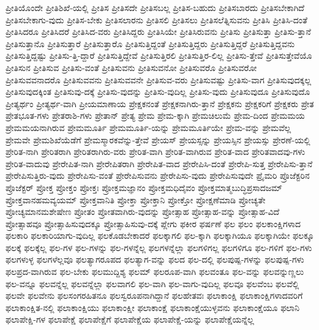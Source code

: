 {ಪ್ರೀತಿಯೊಂದೇ
ಪ್ರೀತಿಶಿಖೆ-ಯಲ್ಲಿ
ಪ್ರೀತಿಸ
ಪ್ರೀತಿಸದೇ
ಪ್ರೀತಿಸಬಲ್ಲ
ಪ್ರೀತಿಸ-ಬಹುದು
ಪ್ರೀತಿಸಬಾರದು
ಪ್ರೀತಿಸಬೇಕಾಗಿದೆ
ಪ್ರೀತಿಸಬೇಕಾಗು-ವುದು
ಪ್ರೀತಿಸ-ಬೇಕು
ಪ್ರೀತಿಸಲಾರನು
ಪ್ರೀತಿಸಲಿ
ಪ್ರೀತಿಸಲು
ಪ್ರೀತಿಸಲೆತ್ನಿಸುವನು
ಪ್ರೀತಿಸಿ
ಪ್ರೀತಿಸಿ-ದಂತೆ
ಪ್ರೀತಿಸಿದರೂ
ಪ್ರೀತಿಸಿದರೆ
ಪ್ರೀತಿಸಿದ-ವರು
ಪ್ರೀತಿಸಿದ್ದರು
ಪ್ರೀತಿಸಿಯೇ
ಪ್ರೀತಿಸಿರುವನು
ಪ್ರೀತಿಸು
ಪ್ರೀತಿಸುತ್ತಾ
ಪ್ರೀತಿಸು-ತ್ತಾನೆ
ಪ್ರೀತಿಸುತ್ತಾನೊ
ಪ್ರೀತಿಸುತ್ತಾರೆ
ಪ್ರೀತಿಸುತ್ತಾರೊ
ಪ್ರೀತಿಸುತ್ತಿದ್ದಂತೆ
ಪ್ರೀತಿಸುತ್ತಿದ್ದರು
ಪ್ರೀತಿಸುತ್ತಿದ್ದರೆ
ಪ್ರೀತಿಸುತ್ತಿದ್ದವನು
ಪ್ರೀತಿಸುತ್ತಿದ್ದಷ್ಟು
ಪ್ರೀತಿಸು-ತ್ತಿ-ದ್ದಾರೆ
ಪ್ರೀತಿಸುತ್ತಿದ್ದೇವೆ
ಪ್ರೀತಿಸುತ್ತಿರಲಿ
ಪ್ರೀತಿಸುತ್ತಿರ-ಲಿಲ್ಲ
ಪ್ರೀತಿಸು-ತ್ತೇವೆ
ಪ್ರೀತಿಸುತ್ತೇವೆಯೊ
ಪ್ರೀತಿಸುನ
ಪ್ರೀತಿಸುವ
ಪ್ರೀತಿಸು-ವಂತೆ
ಪ್ರೀತಿಸುವನು
ಪ್ರೀತಿಸುವನೋ
ಪ್ರೀತಿಸುವರೊ
ಪ್ರೀತಿಸುವರೋ
ಪ್ರೀತಿಸುವವನಾದರೊ
ಪ್ರೀತಿಸುವವನು
ಪ್ರೀತಿಸುವವನೇ
ಪ್ರೀತಿಸುವ-ವರು
ಪ್ರೀತಿಸುವಷ್ಟು
ಪ್ರೀತಿಸು-ವಾಗ
ಪ್ರೀತಿಸುವುದಕ್ಕಲ್ಲ
ಪ್ರೀತಿಸುವುದಕ್ಕಿಂತ
ಪ್ರೀತಿಸುವು-ದಕ್ಕೆ
ಪ್ರೀತಿಸು-ವುದನ್ನು
ಪ್ರೀತಿಸು-ವುದಿಲ್ಲ
ಪ್ರೀತಿಸು-ವುದು
ಪ್ರೀತಿಸುವುದೂ
ಪ್ರೀತಿಸುವುದೊ
ಪ್ರೀತ್ಯರ್ಥಂ
ಪ್ರೀತ್ಯರ್ಥ-ವಾಗಿ
ಪ್ರೀಯಮಾಣಾಯ
ಪ್ರೇಕ್ಷಕನಂತೆ
ಪ್ರೇಕ್ಷಕನಾಗಿರು-ತ್ತಾನೆ
ಪ್ರೇಕ್ಷಕನು
ಪ್ರೇಕ್ಷಕರಿಗೆ
ಪ್ರೇಕ್ಷಕರು
ಪ್ರೇತ
ಪ್ರೇತಭೂತ-ಗಳು
ಪ್ರೇತರಾಶಿ-ಗಳು
ಪ್ರೇತಾನ್
ಪ್ರೇತ್ಯ
ಪ್ರೇಮ
ಪ್ರೇಮ-ಕ್ಕಾಗಿ
ಪ್ರೇಮಚಿಲುಮೆ
ಪ್ರೇಮ-ದಿಂದ
ಪ್ರೇಮಮಯ
ಪ್ರೇಮಮಯನಾಗಿರುವ
ಪ್ರೇಮಮೂರ್ತಿ
ಪ್ರೇಮಮೂರ್ತಿ-ಯನ್ನು
ಪ್ರೇಮಮೂರ್ತಿಯೇ
ಪ್ರೇಮ-ವನ್ನು
ಪ್ರೇಮವೆಲ್ಲ
ಪ್ರೇಮವೇ
ಪ್ರೇಮಶಿಖೆಯೆಡೆಗೆ
ಪ್ರೇಮಸ್ಮಾರಕವೆನ್ನು-ತ್ತೇವೆ
ಪ್ರೇಯಸ್
ಪ್ರೇಯಸ್ಸನ್ನು
ಪ್ರೇಯಸ್ಸಿನ
ಪ್ರೇಯಸ್ಸು
ಪ್ರೇರಣೆ-ಯಲ್ಲಿ
ಪ್ರೇರಿತ-ನಾಗಿ
ಪ್ರೇರಿತರಾಗಿ
ಪ್ರೇರಿತರಾಗಿರು-ವರು
ಪ್ರೇರಿತ-ವಾಗಿ
ಪ್ರೇರಿತ-ವಾಗಿರುವ
ಪ್ರೇರಿತ-ವಾದ
ಪ್ರೇರಿತವಾದವು-ಗಳು
ಪ್ರೇರಿತ-ವಾದುವು
ಪ್ರೇರೇಪಿತ-ನಾಗಿ
ಪ್ರೇರೇಪಿತರಾಗಿ
ಪ್ರೇರೇಪಿತ-ವಾದ
ಪ್ರೇರೇಪಿಸಿ-ದಂತೆ
ಪ್ರೇರೇಪಿ-ಸುತ್ತ
ಪ್ರೇರೇಪಿಸು-ತ್ತಾನೆ
ಪ್ರೇರೇಪಿಸುತ್ತಿರು-ವುದು
ಪ್ರೇರೇಪಿಸು-ವಂತೆ
ಪ್ರೇರೇಪಿಸುವನು
ಪ್ರೇರೇಪಿಸು-ವುದು
ಪ್ರೇರೇಪಿಸುವುದೇ
ಪ್ರೈಮರಿ
ಪ್ರೊಜೆಕ್ಟರಿನ
ಪ್ರೊಜೆಕ್ಟರ್
ಪ್ರೋಕ್ತ
ಪ್ರೋಕ್ತಂ
ಪ್ರೋಕ್ತಃ
ಪ್ರೋಕ್ತಮಜ್ಞಾನಂ
ಪ್ರೋಕ್ತಮಧಿದೈವಂ
ಪ್ರೋಕ್ತಮಾತ್ಮಬುದ್ಧಿಪ್ರಸಾದಜಮ್
ಪ್ರೋಕ್ತವಾನಹಮವ್ಯಯಮ್
ಪ್ರೋಕ್ತವಾನಿತಿ
ಪ್ರೋಕ್ತಾ
ಪ್ರೋಕ್ತಾನಿ
ಪ್ರೋಕ್ತೋ
ಪ್ರೋಕ್ಷಣೆಮಾಡಿ
ಪ್ರೋಚ್ಯತೇ
ಪ್ರೋಚ್ಯಮಾನಮಶೇಷೇಣ
ಪ್ರೋತಂ
ಪ್ರೋತವಾಗಿರು-ವುದನ್ನು
ಪ್ರೋತ್ಸಾಹ
ಪ್ರೋತ್ಸಾಹ-ವನ್ನು
ಪ್ರೋತ್ಸಾಹ-ವಿದೆ
ಪ್ರೋತ್ಸಾಹವೂ
ಪ್ರೋತ್ಸಾಹಿಸುವುದಕ್ಕೂ
ಪ್ರೋತ್ಸಾಹಿಸುವು-ದಕ್ಕೆ
ಪ್ಲೇಗು
ಫಕೀರ
ಫರ್ಷಣೆ
ಫಲ
ಫಲಂ
ಫಲಕಾಂಕ್ಷಿಗಳಾದ
ಫಲಕಾರಿ
ಫಲಕಾರಿಯಾಗು-ವುದಿಲ್ಲ
ಫಲಕೊಡಬೇಕಾದರೆ
ಫಲಕ್ಕಾಗಲಿ
ಫಲ-ಕ್ಕಾಗಿ
ಫಲಕ್ಕಾಗಿಯೂ
ಫಲಕ್ಕಾಗಿಯೇ
ಫಲಕ್ಕೂ
ಫಲಕ್ಕೆ
ಫಲಕ್ಕೆಲ್ಲ
ಫಲ-ಗಳ
ಫಲ-ಗಳನ್ನು
ಫಲ-ಗಳನ್ನೆಲ್ಲ
ಫಲಗಳನ್ನೆಲ್ಲಾ
ಫಲಗಳಿಗಲ್ಲ
ಫಲಗಳಿಗೂ
ಫಲ-ಗಳಿಗೆ
ಫಲ-ಗಳು
ಫಲಗಳುಳ್ಳ
ಫಲಗಳೆಲ್ಲವೂ
ಫಲತ್ಯಾಗರೂಪದ
ಫಲತ್ಯಾಗ-ವನ್ನು
ಫಲದ
ಫಲ-ದಲ್ಲಿ
ಫಲಪುಷ್ಪ-ಗಳನ್ನು
ಫಲಪುಷ್ಪ-ಗಳು
ಫಲಪ್ರದ-ವಾಗಿರುವ
ಫಲ-ಬೇಕು
ಫಲಮುದ್ದಿಶ್ಯ
ಫಲಮ್
ಫಲರೂಪ-ವಾಗಿ
ಫಲವಂತೂ
ಫಲ-ವನ್ನು
ಫಲವನ್ನುಣ್ಣಲು
ಫಲ-ವನ್ನೂ
ಫಲವನ್ನೆಲ್ಲ
ಫಲವನ್ನೆಲ್ಲಾ
ಫಲವಾಗಲಿ
ಫಲ-ವಾಗಿ
ಫಲ-ವಾಗು-ವುದಿಲ್ಲ
ಫಲವೂ
ಫಲವೆಂಬ
ಫಲವೆಲ್ಲಿ
ಫಲವೇ
ಫಲವೇನು
ಫಲಸಂಗರಹಿತನೂ
ಫಲಸ್ವರೂಪನಾಗಿದ್ದಾನೆ
ಫಲಹೇತವಃ
ಫಲಾಕಾಂಕ್ಷಿ
ಫಲಾಕಾಂಕ್ಷಿಗಳಾದವರಿಗೆ
ಫಲಾಕಾಂಕ್ಷಿತ-ನಲ್ಲಿ
ಫಲಾಕಾಂಕ್ಷಿಯು
ಫಲಾಕಾಂಕ್ಷೀ
ಫಲಾಕಾಂಕ್ಷೆ
ಫಲಾಕಾಂಕ್ಷೆಯುಳ್ಳವನು
ಫಲಾಕಾಂಕ್ಷೆಯೂ
ಫಲಾನಿ
ಫಲಾಪೇಕ್ಷಿ-ಗಳ
ಫಲಾಪೇಕ್ಷೆ
ಫಲಾಪೇಕ್ಷೆಗೆ
ಫಲಾಪೇಕ್ಷೆಯ
ಫಲಾಪೇಕ್ಷೆ-ಯನ್ನು
ಫಲಾಪೇಕ್ಷೆಯನ್ನೆಲ್ಲ
}
